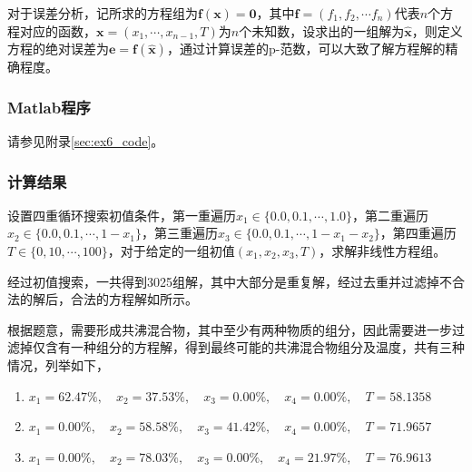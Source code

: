 \documentclass[12pt,a4paper]{article}
\begin{document}
对于误差分析，记所求的方程组为$\boldsymbol{f}(\boldsymbol{x}) = \boldsymbol{0}$，其中$\boldsymbol{f} = (f_1, f_2, \cdots f_n)$代表$n$个方程对应的函数，$\boldsymbol{x}=(x_1,\cdots, x_{n-1}, T)$为$n$个未知数，设求出的一组解为$\hat{\boldsymbol{x}}$，则定义方程的绝对误差为$\boldsymbol{e} = \boldsymbol{f}(\hat{\boldsymbol{x}})$，通过计算误差的p-范数，可以大致了解方程解的精确程度。

\subsubsection{Matlab程序}

请参见附录\ref{sec:ex6_code}。

\subsubsection{计算结果}

设置四重循环搜索初值条件，第一重遍历$x_1 \in \{0.0, 0.1, \cdots, 1.0\}$，第二重遍历$x_2 \in \{0.0, 0.1, \cdots, 1-x_1\}$，第三重遍历$x_3 \in \{0.0, 0.1, \cdots, 1-x_1-x_2\}$，第四重遍历$T \in \{0, 10, \cdots, 100\}$，对于给定的一组初值$(x_1, x_2, x_3, T)$，求解非线性方程组。

经过初值搜索，一共得到3025组解，其中大部分是重复解，经过去重并过滤掉不合法的解后，合法的方程解如所示。

根据题意，需要形成共沸混合物，其中至少有两种物质的组分，因此需要进一步过滤掉仅含有一种组分的方程解，得到最终可能的共沸混合物组分及温度，共有三种情况，列举如下，
\begin{enumerate}
    \item $x_1 = 62.47\%, \quad x_2 = 37.53\%, \quad x_3 = 0.00\%, \quad x_4 = 0.00\%, \quad T = 58.1358$
    \item $x_1 = 0.00\%, \quad x_2 = 58.58\%, \quad x_3 = 41.42\%, \quad x_4 = 0.00\%, \quad T = 71.9657$
    \item $x_1 = 0.00\%, \quad x_2 = 78.03\%, \quad x_3 = 0.00\%, \quad x_4 = 21.97\%, \quad T = 76.9613$
\end{enumerate}
\end{document}
